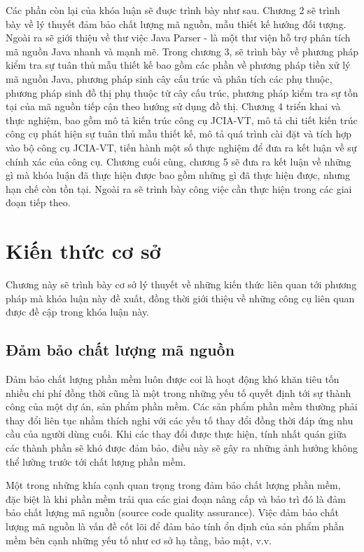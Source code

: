 \documentclass[12pt]{report}
\begin{document}
\noindent Các phần còn lại của khóa luận sẽ đuợc trình bày như sau. Chương 2 sẽ trình bày về lý thuyết đảm bảo chất lượng mã nguồn, mẫu thiết kế hướng đối tượng. Ngoài ra sẽ giới thiệu về thư việc Java Parser - là một thư viện hỗ trợ phân tích mã nguồn Java nhanh và mạnh mẽ. Trong chương 3, sẽ trình bày về phương pháp kiểm tra sự tuân thủ mẫu thiết kế bao gồm các phần về phương pháp tiền xử lý mã nguồn Java, phương pháp sinh cây cấu trúc và phân tích các phụ thuộc, phương pháp sinh đồ thị phụ thuộc từ cây cấu trúc, phương pháp kiểm tra sự tồn tại của mã nguồn tiếp cận theo hướng sử dụng đồ thị. Chương 4 triển khai và thực nghiệm, bao gồm mô tả kiến trúc công cụ JCIA-VT, mô tả chi tiết kiến trúc công cụ phát hiện sự tuân thủ mẫu thiết kế, mô tả quá trình cài đặt và tích hợp vào bộ công cụ JCIA-VT, tiến hành một số thực nghiệm để đưa ra kết luận về sự chính xác của công cụ.  Chương cuối cùng, chương 5 sẽ đưa ra kết luận về những gì mà khóa luận đã thực hiện được bao gồm những gì đã thực hiện được, nhưng hạn chế còn tồn tại. Ngoài ra sẽ trình bày công việc cần thực hiện trong các giai đoạn tiếp theo.

\chapter{Kiến thức cơ sở}
\label{chap:background}
Chương này sẽ trình bày cơ sở lý thuyết về những kiến thức liên quan tới phương pháp mà khóa luận này đề xuất, đồng thời giới thiệu về những công cụ liên quan được đề cập trong khóa luận này.
\section{Đảm bảo chất lượng mã nguồn}
Đảm bảo chất lượng phần mềm luôn được coi là hoạt động khó khăn tiêu tốn nhiều chi phí đồng thời cũng là một trong những yếu tố quyết định tới sự thành công của một dự án, sản phẩm phần mềm. Các sản phẩm phần mềm thường phải thay đổi liên tục nhằm thích nghi với các yếu tố thay đổi đồng thời đáp ứng nhu cầu của người dùng cuối. Khi các thay đổi được thực hiện, tính nhất quán giữa các thành phần sẽ khó được đảm bảo, điều này sẽ gây ra những ảnh hưởng không thể lường trước tới chất lượng phần mềm.

\noindent Một trong những khía cạnh quan trọng trong đảm bảo chất lượng phần mềm, đặc biệt là khi phần mềm trải qua các giai đoạn nâng cấp và bảo trì đó là đảm bảo chất lượng mã nguồn (source code quality assurance). Việc đảm bảo chất lượng mã nguồn là vấn đề cốt lõi để đảm bảo tính ổn định của sản phẩm phần mềm bên cạnh những yếu tố như cơ sở hạ tầng, bảo mật, v.v.
\end{document}
